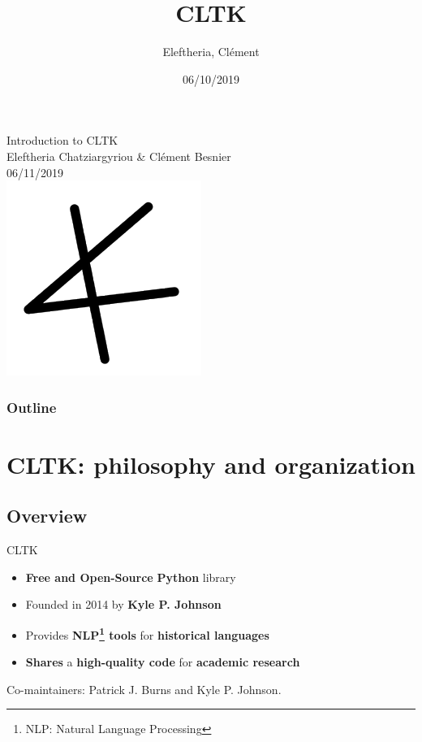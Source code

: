 \documentclass{beamer}
\title{CLTK}
\author{Eleftheria, Clément}
\institute{CLTK}
\date{06/10/2019}
\begin{document}
\begin{frame}
\begin{center}
    {\large Introduction to CLTK}\\
    Eleftheria Chatziargyriou \& Clément Besnier \\
    06/11/2019 \\
    \includegraphics[scale=0.5]{cltklogo.png}
\end{center}

\end{frame}

\begin{frame}
\frametitle{Outline}
\tableofcontents
\end{frame}

\section{CLTK: philosophy and organization}

\subsection{Overview}

\begin{frame}{CLTK}
\begin{itemize}
    \item \textbf{Free and Open-Source} \textbf{Python} library
    \pause
    \item Founded in 2014 by \textbf{Kyle P. Johnson}
    \pause
    \item Provides \textbf{NLP\footnote{NLP: Natural Language Processing} tools} for \textbf{historical languages}
    \pause
    \item \textbf{Shares} a \textbf{high-quality code} for \textbf{academic research}
    
\end{itemize}
\pause
Co-maintainers: Patrick J. Burns and Kyle P. Johnson.
    
\end{frame}
\end{document}
